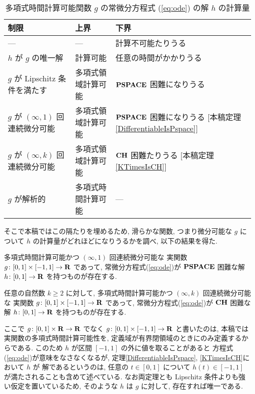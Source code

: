 \begin{table}
\renewcommand\arraystretch{1.3}
\begin{center}
 \caption{多項式時間計算可能関数 $g$ の常微分方程式 (\ref{eq:ode}) の解 $h$ の計算量}
 \label{table:related}
 \begin{tabular}{lll}
  制限 & 上界 & 下界 \\
  \hline
   --- & --- & 計算不可能たりうる \cite{pour1979computable} \\
  $h$ が $g$ の唯一解 & 計算可能 \cite{coddington1955theory}
  & 任意の時間がかかりうる \cite{ko1983computational, miller1970recursive} \\
  $g$ が Lipschitz 条件を満たす & 多項式領域計算可能
      &	$\mathbf{PSPACE}$ 困難になりうる \cite{kawamura2010lipschitz}\\
  $g$ が $(\infty, 1)$ 回連続微分可能 & 多項式領域計算可能 & \parbox[t]{14zw}{$\mathbf{PSPACE}$ 困難になりうる\\{}[本稿定理\ref{DifferentiableIsPspace}]} \\
  $g$ が $(\infty, k)$ 回連続微分可能 & 多項式領域計算可能 & \parbox[t]{14zw}{$\mathbf{CH}$ 困難たりうる\\{}[本稿定理\ref{KTimesIsCH}]} \\
  $g$ が解析的 
  & 多項式時間計算可能 \cite{ko1988computing, kawamura2010complexity} 
  & ---
 \end{tabular}
\end{center}
\end{table}

そこで本稿ではこの隔たりを埋めるため, 滑らかな関数, 
つまり微分可能な $g$ について $h$ の計算量がどれほどになりうるかを調べ,
以下の結果を得た.

 \begin{theorem}
  \label{DifferentiableIsPspace}
  多項式時間計算可能かつ $(\infty, 1)$ 回連続微分可能な
  実関数 $g \colon [0,1] \times [-1,1] \to \mathbf R$ であって, 
  常微分方程式(\ref{eq:ode})が
  $\mathbf{PSPACE}$ 困難な解 $h \colon [0, 1] \to \mathbf R$ を持つものが存在する.
 \end{theorem}

 \begin{theorem}
  \label{KTimesIsCH}
  任意の自然数 $k \ge 2$ に対して, 
  多項式時間計算可能かつ $(\infty, k)$ 回連続微分可能な
  実関数 $g \colon [0,1] \times [-1,1] \to \mathbf R$ であって, 
  常微分方程式(\ref{eq:ode})が
  $\mathbf{CH}$ 困難な解 $h \colon [0, 1] \to \mathbf R$ を持つものが存在する.
 \end{theorem}

ここで $g \colon [0,1] \times \mathbf R \to \mathbf R$ でなく
$g \colon [0,1] \times [-1, 1] \to \mathbf R$ と書いたのは, 
本稿では実関数の多項式時間計算可能性を, 
定義域が有界閉領域のときにのみ定義するからである. 
このため $h$ が区間 $[-1, 1]$ の外に値を取ることがあると
方程式(\ref{eq:ode})が意味をなさなくなるが, 
定理\ref{DifferentiableIsPspace}, \ref{KTimesIsCH}において $h$ が
解であるというのは, 
任意の $t \in [0, 1]$ について $h (t) \in [-1, 1]$ が満たされることも含めて述べている.
なお両定理とも Lipschitz 条件よりも強い仮定を置いているため, 
そのような $h$ は $g$ に対して, 存在すれば唯一である. 

